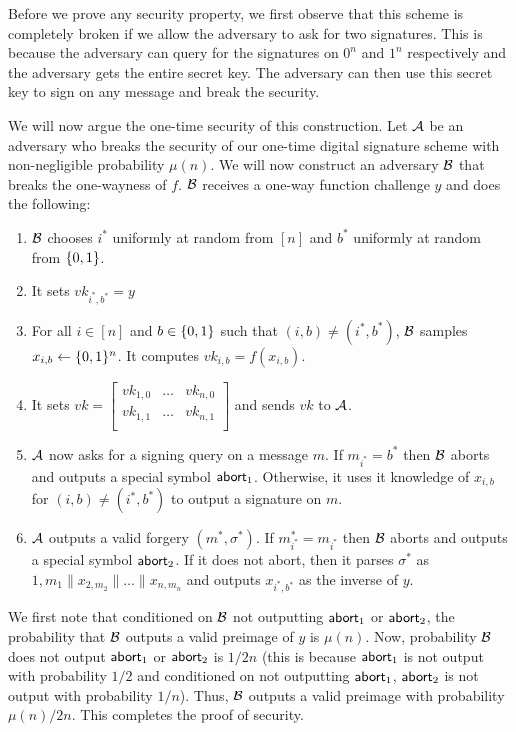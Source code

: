 \documentclass[12pt]{tufte-book}
\begin{document}
Before we prove any security property, we first observe that this scheme is completely broken if we allow the adversary to ask for two signatures. This is because the adversary can query for the signatures on $0^n$ and $1^n$ respectively and the adversary gets the entire secret key. The adversary can then use this secret key to sign on any message and break the security. 

We will now argue the one-time security of this construction. Let $\mathcal{A}$ be an adversary who breaks the security of our one-time digital signature scheme with non-negligible probability $\mu(n)$. We will now construct an adversary $\mathcal{B}$ that breaks the one-wayness of $f$. $\mathcal{B}$ receives a one-way function challenge $y$ and does the following:
\begin{enumerate}
    \item $\mathcal{B}$ chooses $i^*$ uniformly at random from $[n]$ and $b^*$ uniformly at random from $\{0,1\}$.
    \item It sets $vk_{i^*,b^*} = y$
    \item For all $i \in [n]$ and $b \in \{0,1\}$ such that $(i,b) \neq (i^*,b^*)$, $\mathcal{B}$ samples $x_{i,b} \gets \{0,1\}^n$. It computes $vk_{i,b} = f(x_{i,b})$.
    \item It sets $vk = \left[ \begin{array}{ccc}
vk_{1,0} & \ldots& vk_{n,0} \\
vk_{1,1} & \ldots& vk_{n,1} \\
\end{array} \right]$ and sends $vk$ to $\mathcal{A}$.
\item $\mathcal{A}$ now asks for a signing query on a message $m$. If $m_{i^*} = b^*$ then $\mathcal{B}$ aborts and outputs a special symbol $\mathsf{abort}_1$. Otherwise, it uses it knowledge of $x_{i,b}$ for $(i,b) \neq (i^*,b^*)$ to output a signature on $m$.
\item $\mathcal{A}$ outputs a valid forgery $(m^*,\sigma^*)$. If $m^*_{i^*} = m_{i^*}$ then $\mathcal{B}$ aborts and outputs a special symbol $\mathsf{abort}_2$. If it does not abort, then it parses $\sigma^*$ as ${1,m_1}\|x_{2,m_2}\| \ldots \| x_{n,m_n}$ and outputs $x_{i^*,b^*}$ as the inverse of $y$.
\end{enumerate}
We first note that conditioned on $\mathcal{B}$ not outputting $\mathsf{abort}_1$ or $\mathsf{abort}_2$, the probability that $\mathcal{B}$ outputs a valid preimage of $y$ is $\mu(n)$. Now, probability $\mathcal{B}$ does not output $\mathsf{abort}_1$ or $\mathsf{abort}_2$ is $1/2n$ (this is because $\mathsf{abort}_1$ is not output with probability $1/2$ and conditioned on not outputting $\mathsf{abort}_1$, $\mathsf{abort}_2$ is not output with probability $1/n$). Thus, $\mathcal{B}$ outputs a valid preimage with probability $\mu(n)/2n$. This completes the proof of security.
\end{document}
